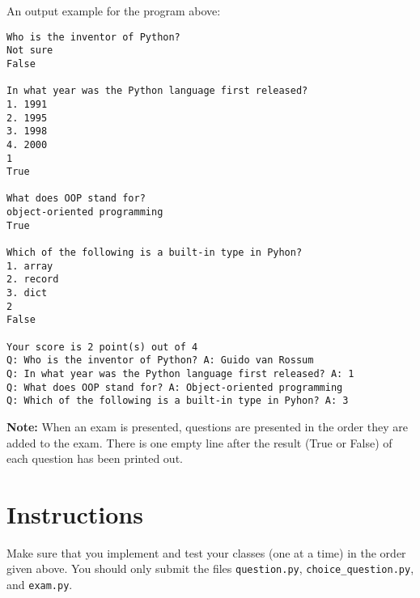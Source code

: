 \noindent
An output example for the program above:

\begin{verbatim}
Who is the inventor of Python?
Not sure
False

In what year was the Python language first released?
1. 1991
2. 1995
3. 1998
4. 2000
1
True

What does OOP stand for?
object-oriented programming
True

Which of the following is a built-in type in Pyhon?
1. array
2. record
3. dict
2
False

Your score is 2 point(s) out of 4
Q: Who is the inventor of Python? A: Guido van Rossum
Q: In what year was the Python language first released? A: 1
Q: What does OOP stand for? A: Object-oriented programming
Q: Which of the following is a built-in type in Pyhon? A: 3
\end{verbatim}

\noindent
\textbf{Note:} When an exam is presented, questions are presented in the order they are added to the exam.
There is one empty line after the result (True or False) of each question has been printed out.

\section*{Instructions}
Make sure that you implement and test your classes (one at a time) in the order given above. 
You should only submit the files \texttt{question.py}, \texttt{choice\_question.py}, and \texttt{exam.py}.